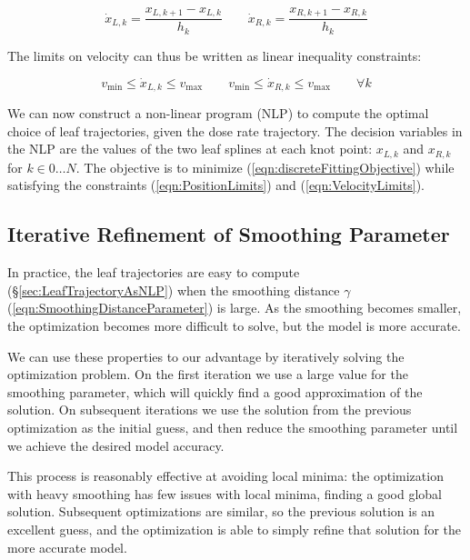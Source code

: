 \begin{equation}
  \dot{x}_{L, k} = \frac{x_{L, k+1} - x_{L, k}}{h_k}
  \quad \quad
  \dot{x}_{R, k} = \frac{x_{R, k+1} - x_{R, k}}{h_k}
\end{equation}

The limits on velocity can thus be written as linear inequality constraints:

\begin{equation}
  v_\text{min} \leq \dot{x}_{L, k} \leq v_\text{max}
  \quad \quad
  v_\text{min} \leq \dot{x}_{R, k} \leq v_\text{max}
  \quad \quad \forall k
  \label{eqn:VelocityLimits}
\end{equation}

We can now construct a non-linear program (NLP) to compute the optimal choice of leaf trajectories,
given the dose rate trajectory.
The decision variables in the NLP are the values of the two leaf splines at each knot point:
$x_{L,k}$ and $x_{R,k}$ for $k \in 0 \dots N$.
The objective is to minimize (\ref{eqn:discreteFittingObjective}) while satisfying the constraints (\ref{eqn:PositionLimits}) and (\ref{eqn:VelocityLimits}).

\subsection{Iterative Refinement of Smoothing Parameter}

In practice, the leaf trajectories are easy to compute (\S\ref{sec:LeafTrajectoryAsNLP})
when the smoothing distance $\gamma$ (\ref{eqn:SmoothingDistanceParameter}) is large.
As the smoothing becomes smaller, the optimization becomes more difficult to solve,
but the model is more accurate.

We can use these properties to our advantage by iteratively solving the optimization problem.
On the first iteration we use a large value for the smoothing parameter,
which will quickly find a good approximation of the solution.
On subsequent iterations we use the solution from the previous optimization as the initial guess,
and then reduce the smoothing parameter until we achieve the desired model accuracy.

This process is reasonably effective at avoiding local minima:
the optimization with heavy smoothing has few issues with local minima, finding a good global solution.
Subsequent optimizations are similar, so the previous solution is an excellent guess, and the optimization
is able to simply refine that solution for the more accurate model.

